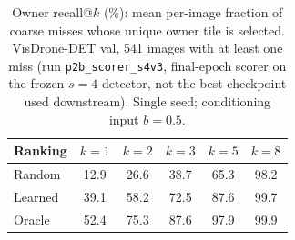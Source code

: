 \begin{table}[t]
\caption{Owner recall@$k$ (\%): mean per-image fraction of coarse misses whose unique owner tile is selected. VisDrone-DET val, 541 images with at least one miss (run \texttt{p2b\_scorer\_s4v3}, final-epoch scorer on the frozen $s{=}4$ detector, not the best checkpoint used downstream). Single seed; conditioning input $b=0.5$.}
\label{tab:selection}
\centering
\begin{tabular}{lccccc}
\toprule
Ranking & $k{=}1$ & $k{=}2$ & $k{=}3$ & $k{=}5$ & $k{=}8$ \\
\midrule
Random & 12.9 & 26.6 & 38.7 & 65.3 & 98.2 \\
Learned & 39.1 & 58.2 & 72.5 & 87.6 & 99.7 \\
Oracle & 52.4 & 75.3 & 87.6 & 97.9 & 99.9 \\
\bottomrule
\end{tabular}
\end{table}
